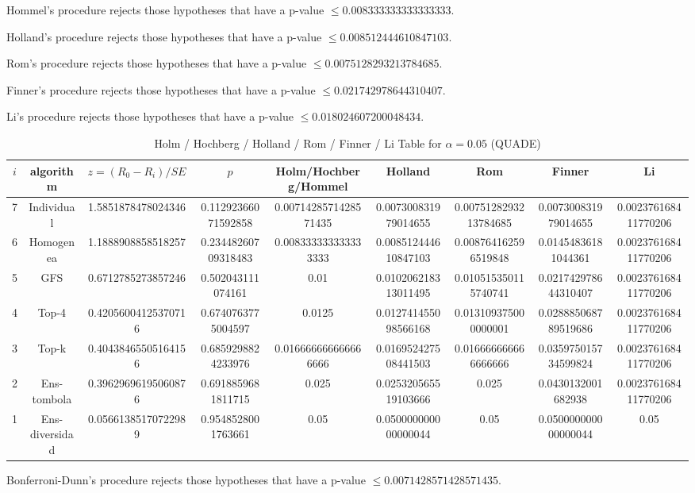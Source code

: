 \documentclass[a4paper,10pt]{article}
\begin{document}
\begin{landscape}
Hommel's procedure rejects those hypotheses that have a p-value $\le0.008333333333333333$.


Holland's procedure rejects those hypotheses that have a p-value $\le0.008512444610847103$.


Rom's procedure rejects those hypotheses that have a p-value $\le0.0075128293213784685$.


Finner's procedure rejects those hypotheses that have a p-value $\le0.021742978644310407$.


Li's procedure rejects those hypotheses that have a p-value $\le0.018024607200048434$.



\newpage

\begin{table}[!htp]
\centering\scriptsize
\caption{Holm / Hochberg / Holland / Rom / Finner / Li Table for $\alpha=0.05$ (QUADE)}
\begin{tabular}{ccccccccc}
$i$&algorithm&$z=(R_0 - R_i)/SE$&$p$&Holm/Hochberg/Hommel&Holland&Rom&Finner&Li\\
\hline
7&Individual&1.5851878478024346&0.11292366071592858&0.0071428571428571435&0.007300831979014655&0.0075128293213784685&0.007300831979014655&0.002376168411770206\\
6&Homogenea&1.1888908858518257&0.23448260709318483&0.008333333333333333&0.008512444610847103&0.008764162596519848&0.01454836181044361&0.002376168411770206\\
5&GFS&0.6712785273857246&0.502043111074161&0.01&0.010206218313011495&0.010515350115740741&0.021742978644310407&0.002376168411770206\\
4&Top-4&0.42056004125370716&0.6740763775004597&0.0125&0.012741455098566168&0.013109375000000001&0.028885068789519686&0.002376168411770206\\
3&Top-k&0.40438465505164156&0.6859298824233976&0.016666666666666666&0.016952427508441503&0.016666666666666666&0.035975015734599824&0.002376168411770206\\
2&Ens-tombola&0.39629696195060876&0.6918859681811715&0.025&0.025320565519103666&0.025&0.0430132001682938&0.002376168411770206\\
1&Ens-diversidad&0.05661385170722989&0.9548528001763661&0.05&0.050000000000000044&0.05&0.050000000000000044&0.05\\
\hline
\end{tabular}
\end{table}
Bonferroni-Dunn's procedure rejects those hypotheses that have a p-value $\le0.0071428571428571435$.



\end{landscape}
\end{document}
